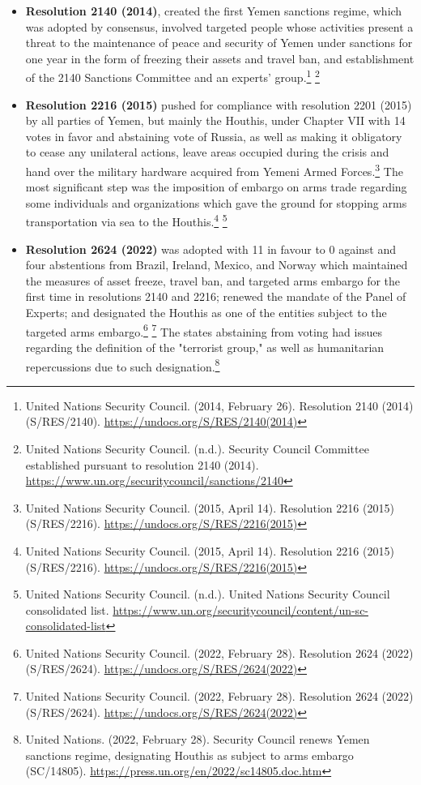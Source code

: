 \begin{itemize}
  \item \textbf{Resolution 2140 (2014)}, created the first Yemen sanctions regime, which was adopted by consensus, involved targeted people whose activities present a threat to the maintenance of peace and security of Yemen under sanctions for one year in the form of freezing their assets and travel ban, and establishment of the 2140 Sanctions Committee and an experts’ group.\footnote{United Nations Security Council. (2014, February 26). Resolution 2140 (2014) (S/RES/2140). \url{https://undocs.org/S/RES/2140(2014)}} \footnote{United Nations Security Council. (n.d.). Security Council Committee established pursuant to resolution 2140 (2014). \url{https://www.un.org/securitycouncil/sanctions/2140}}
  \item \textbf{Resolution 2216 (2015)} pushed for compliance with resolution 2201 (2015) by all parties of Yemen, but mainly the Houthis, under Chapter VII with 14 votes in favor and abstaining vote of Russia, as well as making it obligatory to cease any unilateral actions, leave areas occupied during the crisis and hand over the military hardware acquired from Yemeni Armed Forces.\footnote{United Nations Security Council. (2015, April 14). Resolution 2216 (2015) (S/RES/2216). \url{https://undocs.org/S/RES/2216(2015)}} The most significant step was the imposition of embargo on arms trade regarding some individuals and organizations which gave the ground for stopping arms transportation via sea to the Houthis.\footnote{United Nations Security Council. (2015, April 14). Resolution 2216 (2015) (S/RES/2216). \url{https://undocs.org/S/RES/2216(2015)}} \footnote{United Nations Security Council. (n.d.). United Nations Security Council consolidated list. \url{https://www.un.org/securitycouncil/content/un-sc-consolidated-list}}
  \item \textbf{Resolution 2624 (2022)} was adopted with 11 in favour to 0 against and four abstentions from Brazil, Ireland, Mexico, and Norway which maintained the measures of asset freeze, travel ban, and targeted arms embargo for the first time in resolutions 2140 and 2216; renewed the mandate of the Panel of Experts; and designated the Houthis as one of the entities subject to the targeted arms embargo.\footnote{United Nations Security Council. (2022, February 28). Resolution 2624 (2022) (S/RES/2624). \url{https://undocs.org/S/RES/2624(2022)}} \footnote{United Nations Security Council. (2022, February 28). Resolution 2624 (2022) (S/RES/2624). \url{https://undocs.org/S/RES/2624(2022)}} The states abstaining from voting had issues regarding the definition of the "terrorist group," as well as humanitarian repercussions due to such designation.\footnote{United Nations. (2022, February 28). Security Council renews Yemen sanctions regime, designating Houthis as subject to arms embargo (SC/14805). \url{https://press.un.org/en/2022/sc14805.doc.htm}}

\end{itemize}
